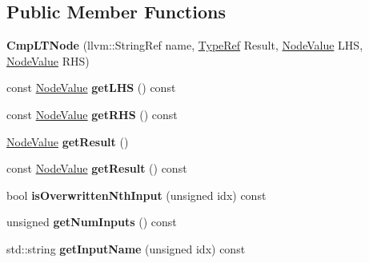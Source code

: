 \subsection*{Public Member Functions}
\begin{DoxyCompactItemize}
\item 
\mbox{\label{classglow_1_1_cmp_l_t_node_ad1f72f15d08f8d096733a3cab314d61b}} 
{\bfseries Cmp\+L\+T\+Node} (llvm\+::\+String\+Ref name, \hyperlink{structglow_1_1_type}{Type\+Ref} Result, \hyperlink{structglow_1_1_node_value}{Node\+Value} L\+HS, \hyperlink{structglow_1_1_node_value}{Node\+Value} R\+HS)
\item 
\mbox{\label{classglow_1_1_cmp_l_t_node_af4b19c5e3a4178d838f52ad470c7eb59}} 
const \hyperlink{structglow_1_1_node_value}{Node\+Value} {\bfseries get\+L\+HS} () const
\item 
\mbox{\label{classglow_1_1_cmp_l_t_node_acdc5f9ca3b6641d368b0d25c1a7b8860}} 
const \hyperlink{structglow_1_1_node_value}{Node\+Value} {\bfseries get\+R\+HS} () const
\item 
\mbox{\label{classglow_1_1_cmp_l_t_node_a6605377d4cbdd973af3c81a66a52b91a}} 
\hyperlink{structglow_1_1_node_value}{Node\+Value} {\bfseries get\+Result} ()
\item 
\mbox{\label{classglow_1_1_cmp_l_t_node_ae6dbbcfc38ba8267a650eae6a39ba64c}} 
const \hyperlink{structglow_1_1_node_value}{Node\+Value} {\bfseries get\+Result} () const
\item 
\mbox{\label{classglow_1_1_cmp_l_t_node_ac1309df3219640d65ca20a797123a891}} 
bool {\bfseries is\+Overwritten\+Nth\+Input} (unsigned idx) const
\item 
\mbox{\label{classglow_1_1_cmp_l_t_node_a0ea145ec657e326e7ef9ccc330d2a33c}} 
unsigned {\bfseries get\+Num\+Inputs} () const
\item 
\mbox{\label{classglow_1_1_cmp_l_t_node_acd88569a4ee86162af57956357f1d830}} 
std\+::string {\bfseries get\+Input\+Name} (unsigned idx) const
\item 

\end{DoxyCompactItemize}
